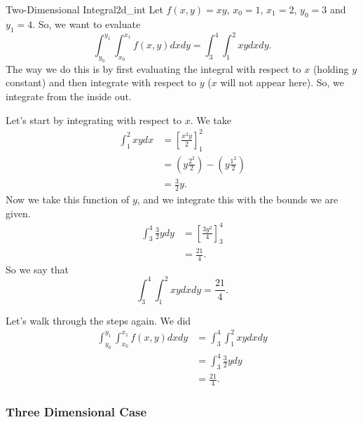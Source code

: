              	        \begin{ex}{Two-Dimensional Integral}{2d_int}
             	        Let $f(x,y)=xy$, $x_0=1$, $x_1=2$, $y_0=3$ and $y_1=4$.  So, we want to evaluate
             	        \[
             	        \int_{y_0}^{y_1}\int_{x_0}^{x_1} f(x,y)dxdy = \int_3^4 \int_1^2 xy dxdy.
             	        \]
             	        The way we do this is by first evaluating the integral with respect to $x$ (holding $y$ constant) and then integrate with respect to $y$ ($x$ will not appear here). So, we integrate from the inside out.  
             	        
             	        Let's start by integrating with respect to $x$. We take
             	        \begin{align*}
             	            \int_1^2 xy dx &= \left[ \frac{x^2y}{2}\right]_1^2\\
             	            &= \left( y\frac{2^2}{2}\right) - \left(y\frac{1^2}{2}\right)\\
             	            &=\frac{3}{2}y.
             	        \end{align*}
             	        Now we take this function of $y$, and we integrate this with the bounds we are given.  
             	        \begin{align*}
             	            \int_3^4 \frac{3}{2}y dy &= \left[ \frac{3y^2}{4} \right]_3^4\\
             	            &= \frac{21}{4}.
             	        \end{align*}
             	        So we say that
             	        \[
             	        \int_3^4 \int_1^2 xy dxdy = \frac{21}{4}.
             	        \]
             	        
             	        Let's walk through the steps again. We did
             	        \begin{align*}
             	            \int_{y_0}^{y_1} \int_{x_0}^{x_1} f(x,y)dxdy&= \int_3^4\int_1^2 xy dxdy\\
             	            &= \int_3^4 \frac{3}{2}ydy \\
             	            &= \frac{21}{4}.
             	        \end{align*}
             	        \end{ex}
             	        
             	        \subsubsection{Three Dimensional Case}
             	        
